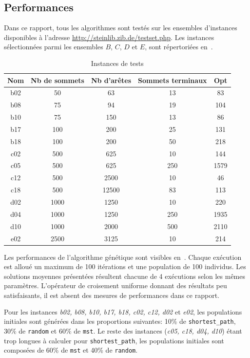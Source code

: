 \documentclass[10pt]{article}
\begin{document}
	\subsection{Performances}
	\label{sec-perf}
	
	Dans ce rapport, tous les algorithmes sont testés sur les ensembles d'instances disponibles à l'adresse \url{http://steinlib.zib.de/testset.php}. Les instances sélectionnées parmi les ensembles $B$, $C$, $D$ et $E$, sont répertoriées en~.
	
	\begin{table}[h!]
		\centering
		\begin{tabular}{|c|c|c|c|c|}
			\hline
			\textbf{Nom} & \textbf{Nb de sommets} & \textbf{Nb d'arêtes} & \textbf{Sommets terminaux} & \textbf{Opt} \\
			\hline
			b02 & 50 & 63 & 13 & 83 \\
			b08	& 75 & 94 &	19 & 104 \\
			b10	& 75 & 150 & 13 & 86 \\
			b17	& 100 &	200 & 25 & 131 \\
			b18	& 100 & 200 & 50 & 218 \\
			c02	& 500 & 625 & 10 & 144 \\
			c05	& 500 & 625 & 250 & 1579 \\
			c12	& 500 & 2500 & 10 & 46 \\
			c18 & 500 & 12500 & 83 & 113 \\
			d02	& 1000 & 1250 & 10 & 220 \\
			d04	& 1000 & 1250 & 250 & 1935 \\
			d10	& 1000 & 2000 &	500 & 2110 \\
			e02	& 2500 & 3125 & 10 & 214 \\
			\hline
		\end{tabular}
		\caption{Instances de tests}
		\label{tab-instances}
	\end{table}
	
	    Les performances de l'algorithme génétique sont visibles en~. Chaque exécution est alloué un maximum de 100 itérations et une population de 100 individus. Les solutions moyennes présentées résultent chacune de 4 exécutions selon les mêmes paramètres. L'opérateur de croisement uniforme donnant des résultats peu satisfaisants, il est absent des mesures de performances dans ce rapport.
	    
	    Pour les instances \textit{b02, b08, b10, b17, b18, c02, c12, d02} et \textit{e02}, les populations initiales sont générées dans les proportions suivantes: 10\% de \texttt{shortest\_path}, 30\% de \texttt{random} et 60\% de \texttt{mst}. Le reste des instances (\textit{c05, c18, d04, d10}) étant trop longues à calculer pour \texttt{shortest\_path}, les populations initiales sont composées de 60\% de \texttt{mst} et 40\% de \texttt{random}.
\end{document}
